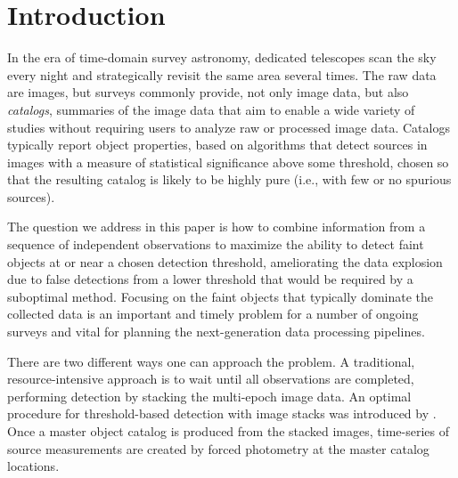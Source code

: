 \documentclass[twocolumn]{emulateapj}
\begin{document}
\section{Introduction}
\label{sec:intro}
\noindent
%
In the era of time-domain survey astronomy, dedicated telescopes scan the sky every night and strategically revisit the same area several times.
The raw data are images, but surveys commonly provide, not only image data, but also \emph{catalogs}, summaries of the image data that aim to enable a wide variety of studies without requiring users to analyze raw or processed image data.
Catalogs typically report object properties, based on algorithms that detect sources in images with a measure of statistical significance above some threshold, chosen so that the resulting catalog is likely to be highly pure (i.e., with few or no spurious sources).
 
The question we address in this paper is how to combine information from a sequence of independent observations to maximize the ability to detect faint objects at or near a chosen detection threshold, ameliorating the data explosion due to false detections from a lower threshold that would be required by a suboptimal method.
Focusing on the faint objects that typically dominate the collected data is an important and timely problem for a number of ongoing surveys and vital for planning the next-generation data processing pipelines.

There are two different ways one can approach the problem. 
A traditional, resource-intensive approach is to wait until all observations are completed, performing detection by stacking the multi-epoch image data.
An optimal procedure for threshold-based detection with image stacks was introduced by \citet{chisq}.
Once a master object catalog is produced from the stacked images, time-series of source measurements are created by forced photometry at the master catalog locations.
\end{document}
